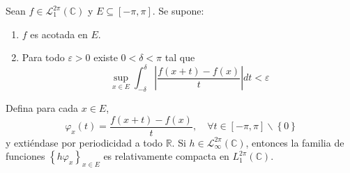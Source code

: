\documentclass[12pt]{report}
\theoremstyle{largebreak}
\newcommand\abs[1]{\ensuremath{\left|#1\right|}}
\begin{document}
    \begin{lema}
        Sean $f\in\mathcal{L}_1^{2\pi}(\mathbb{C})$ y $E\subseteq[-\pi,\pi]$. Se supone:
        \begin{enumerate}
            \item $f$ es acotada en $E$.
            \item Para todo $\varepsilon>0$ existe $0<\delta<\pi$ tal que
            \begin{equation*}
                \sup_{ x\in E}\int_{-\delta}^{\delta}\abs{\frac{f(x+t)-f(x)}{t}}dt<\varepsilon
            \end{equation*}
        \end{enumerate}
        Defina para cada $x\in E$,
        \begin{equation*}
            \varphi_x(t)=\frac{f(x+t)-f(x)}{t},\quad\forall t\in[-\pi,\pi]\backslash\left\{0 \right\}
        \end{equation*}
        y extiéndase por periodicidad a todo $\mathbb{R}$. Si $h\in\mathcal{L}_{\infty}^{2\pi}(\mathbb{C})$, entonces la familia de funciones $\left\{h\varphi_x \right\}_{x\in E}$ es relativamente compacta en $L_1^{2\pi}(\mathbb{C})$.
    \end{lema}
\end{document}
